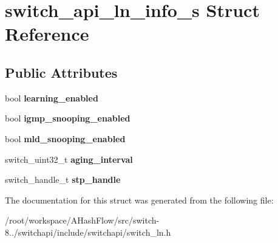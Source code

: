 \hypertarget{structswitch__api__ln__info__s}{\section{switch\+\_\+api\+\_\+ln\+\_\+info\+\_\+s Struct Reference}
\label{structswitch__api__ln__info__s}
}
\subsection*{Public Attributes}
\begin{DoxyCompactItemize}
\item 
\hypertarget{structswitch__api__ln__info__s_af6e79f28c446fd3520f707f61a82bd5c}{bool {\bfseries learning\+\_\+enabled}}\label{structswitch__api__ln__info__s_af6e79f28c446fd3520f707f61a82bd5c}

\item 
\hypertarget{structswitch__api__ln__info__s_aaa6eb39a06d78bd9502b3d868dc83443}{bool {\bfseries igmp\+\_\+snooping\+\_\+enabled}}\label{structswitch__api__ln__info__s_aaa6eb39a06d78bd9502b3d868dc83443}

\item 
\hypertarget{structswitch__api__ln__info__s_af731bd92f65f8eddf6fd8a934ea3d978}{bool {\bfseries mld\+\_\+snooping\+\_\+enabled}}\label{structswitch__api__ln__info__s_af731bd92f65f8eddf6fd8a934ea3d978}

\item 
\hypertarget{structswitch__api__ln__info__s_a6799a6076977a424c7d91b521c2cb47c}{switch\+\_\+uint32\+\_\+t {\bfseries aging\+\_\+interval}}\label{structswitch__api__ln__info__s_a6799a6076977a424c7d91b521c2cb47c}

\item 
\hypertarget{structswitch__api__ln__info__s_ac33ebcdfcec178df8a1b488d47345db2}{switch\+\_\+handle\+\_\+t {\bfseries stp\+\_\+handle}}\label{structswitch__api__ln__info__s_ac33ebcdfcec178df8a1b488d47345db2}

\end{DoxyCompactItemize}


The documentation for this struct was generated from the following file\+:\begin{DoxyCompactItemize}
\item 
/root/workspace/\+A\+Hash\+Flow/src/switch-\/8../switchapi/include/switchapi/switch\+\_\+ln.\+h\end{DoxyCompactItemize}
